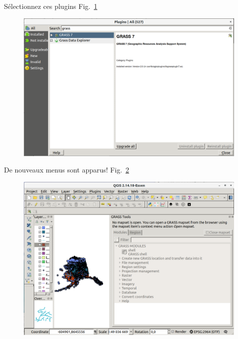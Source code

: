 S\'electionnez ces plugins Fig.~\ref{fig:qgis010}

\begin{figure}[htbp]
   \centering
   \includegraphics[scale=0.19]{qgis010.png}
   \caption{}
   \label{fig:qgis010}
\end{figure}


De nouveaux menus sont apparus! Fig.~\ref{fig:qgis011}

\begin{figure}[htbp]
   \centering
   \includegraphics[scale=0.19]{qgis011.png}
   \caption{}
   \label{fig:qgis011}
\end{figure}


